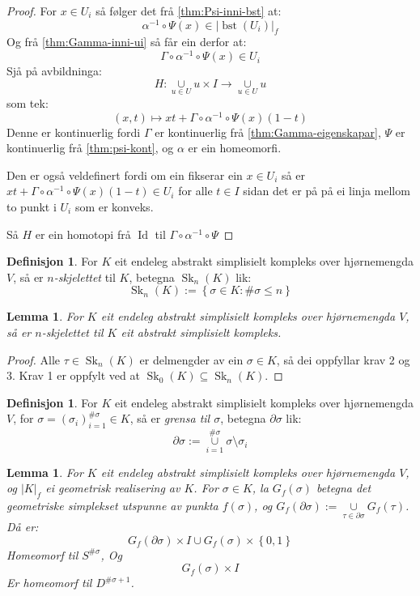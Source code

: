 \documentclass[a4paper, 12pt, norsk]{article}
\theoremstyle{plain}
\newtheorem{lemma}[theorem]{Lemma}
\theoremstyle{definition}
\newtheorem{definition}[theorem]{Definisjon}
\newcommand{\union}{ \mathop{\cup}\limits }
\newcommand{\gr}[1]{ \lvert #1 \rvert } %
\newcommand{\set}[1]{ \left \{ #1 \right \} } %
\newcommand{\tuple}[1]{ \left( #1 \right) } %
\DeclareMathOperator{\bst}{bst}
\DeclareMathOperator{\Sk}{Sk}
\DeclareMathOperator{\Id}{Id}
\begin{document}
\begin{proof}
	For \( x \in U_i \) så følger det frå \autoref{thm:Psi-inni-bst} at:
	\[
		\alpha^{-1} \circ \Psi(x) \in \gr{\bst(U_i)}_f
	\]
	Og frå \autoref{thm:Gamma-inni-ui} så får ein derfor at:
	\[
		\Gamma \circ \alpha^{-1} \circ \Psi(x) \in U_i
	\]
	Sjå på avbildninga:
	\[
		H: \union_{u \in U} u \times I \to \union_{u \in U} u
	\]
	som tek:
	\[
		\tuple{x, t} \mapsto xt + \Gamma \circ \alpha^{-1} \circ \Psi(x)(1-t)
	\]
	Denne er kontinuerlig fordi \( \Gamma \) er kontinuerlig frå \autoref{thm:Gamma-eigenskapar}, \( \Psi \) er kontinuerlig frå \autoref{thm:psi-kont}, og \( \alpha \) er ein homeomorfi.
	
	Den er også veldefinert fordi om ein fikserar ein \( x \in U_i \) så er \( xt + \Gamma \circ \alpha^{-1} \circ \Psi(x)(1-t) \in U_i \) for alle \( t \in I \) sidan det er på på ei linja mellom to punkt i \( U_i \) som er konveks.

	Så \( H \) er ein homotopi frå \( \Id \) til \( \Gamma \circ \alpha^{-1} \circ \Psi \)
\end{proof}

\begin{definition}
	For \( K \) eit endeleg abstrakt simplisielt kompleks over hjørnemengda \( V \), så er \emph{\( n \)-skjelettet} til \( K \), betegna \( \Sk_n(K) \) lik:
	\[
		\Sk_n(K) := \set{\sigma \in K : \#\sigma \leq n}
	\]
\end{definition}

\begin{lemma}
	For \( K \) eit endeleg abstrakt simplisielt kompleks over hjørnemengda \( V \), så er \( n \)-skjelettet til \( K \) eit abstrakt simplisielt kompleks.
\end{lemma}

\begin{proof}
	Alle \( \tau \in \Sk_n(K) \) er delmengder av ein \( \sigma \in K \), så dei oppfyllar krav 2 og 3. Krav 1 er oppfylt ved at \( \Sk_0(K) \subseteq \Sk_n(K) \).
\end{proof}

\begin{definition}
	For \( K \) eit endeleg abstrakt simplisielt kompleks over hjørnemengda \( V \), for \( \sigma = \tuple{\sigma_i}_{i=1}^{\#\sigma} \in K \), så er \emph{grensa til \( \sigma \)}, betegna \( \partial\sigma \) lik:
	\[
		\partial\sigma := \union_{i = 1}^{\#\sigma} \sigma \setminus \sigma_i 
	\]
\end{definition}

\begin{lemma} \label{thm:utvida-funk}
	For \( K \) eit endeleg abstrakt simplisielt kompleks over hjørnemengda \( V \), og \( \gr{K}_f \) ei geometrisk realisering av \( K \). For \( \sigma \in K \), la \( G_f(\sigma) \) betegna det geometriske simplekset utspunne av punkta \( f(\sigma) \), og \( G_f(\partial\sigma) := \union_{\tau \in \partial\sigma} G_f(\tau) \). Då er:
	\[
		G_f(\partial\sigma) \times I \union G_f(\sigma) \times \set{0, 1}
	\] 
	Homeomorf til \( S^{\#\sigma} \), Og
	\[
		G_f(\sigma) \times I
	\] 
	Er homeomorf til \( D^{\#\sigma+1} \).
\end{lemma}
\end{document}
